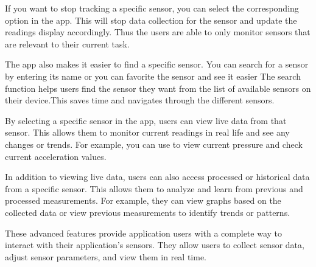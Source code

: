 \documentclass[12pt]{article}
\newcounter{fr}
\begin{document}
\begin{itemize}
\begin{minipage}[t]{0.3\textwidth}
    \end{minipage} 
    \hfill
    \begin{minipage}[t]{0.6\textwidth}
    \item[4]
    If you want to stop tracking a specific sensor, you can select the corresponding option in the app. This will stop data collection for the sensor and update the readings display accordingly. Thus the users are able to only monitor sensors that are relevant to their current task.
    \item[5]
    The app also makes it easier to find a specific sensor. You can search for a sensor by entering its name or you can favorite the sensor and see it easier
    The search function helps users find the sensor they want from the list of available sensors on their device.This saves time and navigates through the different sensors.
    \item[6]
    By selecting a specific sensor in the app, users can view live data from that sensor. This allows them to monitor current readings in real life and see any changes or trends. For example, you can use to view current pressure and check current acceleration values. 
    \end{minipage}
    \item[7]
    In addition to viewing live data, users can also access processed or historical data from a specific sensor. This allows them to analyze and learn from previous and processed measurements. For example, they can view graphs based on the collected data or view previous measurements to identify trends or patterns.
\end{itemize}
    These advanced features provide application users with a complete way to interact with their application's sensors. They allow users to collect sensor data, adjust sensor parameters, and view them in real time.
    
\end{document}
